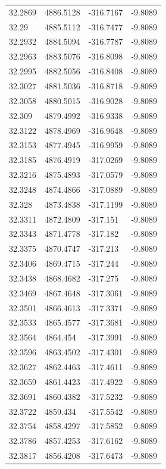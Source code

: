 \begin{table}[H]
\begin{tabular}{llll}
32.2869 & 4886.5128 & -316.7167 & -9.8089 \\
32.29 & 4885.5112 & -316.7477 & -9.8089 \\
32.2932 & 4884.5094 & -316.7787 & -9.8089 \\
32.2963 & 4883.5076 & -316.8098 & -9.8089 \\
32.2995 & 4882.5056 & -316.8408 & -9.8089 \\
32.3027 & 4881.5036 & -316.8718 & -9.8089 \\
32.3058 & 4880.5015 & -316.9028 & -9.8089 \\
32.309 & 4879.4992 & -316.9338 & -9.8089 \\
32.3122 & 4878.4969 & -316.9648 & -9.8089 \\
32.3153 & 4877.4945 & -316.9959 & -9.8089 \\
32.3185 & 4876.4919 & -317.0269 & -9.8089 \\
32.3216 & 4875.4893 & -317.0579 & -9.8089 \\
32.3248 & 4874.4866 & -317.0889 & -9.8089 \\
32.328 & 4873.4838 & -317.1199 & -9.8089 \\
32.3311 & 4872.4809 & -317.151 & -9.8089 \\
32.3343 & 4871.4778 & -317.182 & -9.8089 \\
32.3375 & 4870.4747 & -317.213 & -9.8089 \\
32.3406 & 4869.4715 & -317.244 & -9.8089 \\
32.3438 & 4868.4682 & -317.275 & -9.8089 \\
32.3469 & 4867.4648 & -317.3061 & -9.8089 \\
32.3501 & 4866.4613 & -317.3371 & -9.8089 \\
32.3533 & 4865.4577 & -317.3681 & -9.8089 \\
32.3564 & 4864.454 & -317.3991 & -9.8089 \\
32.3596 & 4863.4502 & -317.4301 & -9.8089 \\
32.3627 & 4862.4463 & -317.4611 & -9.8089 \\
32.3659 & 4861.4423 & -317.4922 & -9.8089 \\
32.3691 & 4860.4382 & -317.5232 & -9.8089 \\
32.3722 & 4859.434 & -317.5542 & -9.8089 \\
32.3754 & 4858.4297 & -317.5852 & -9.8089 \\
32.3786 & 4857.4253 & -317.6162 & -9.8089 \\
32.3817 & 4856.4208 & -317.6473 & -9.8089 \\

\end{tabular}
\end{table}
